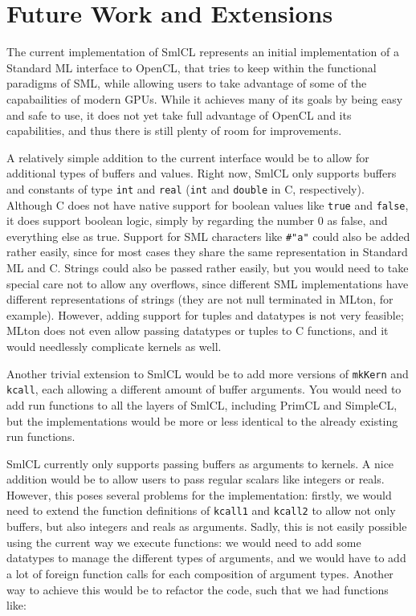 \section{Future Work and Extensions}
\label{futurework}

The current implementation of SmlCL represents an initial
implementation of a Standard ML interface to OpenCL, that tries to
keep within the functional paradigms of SML, while allowing users to
take advantage of some of the capabailities of modern GPUs. While it
achieves many of its goals by being easy and safe to use, it does not
yet take full advantage of OpenCL and its capabilities, and thus there
is still plenty of room for improvements.

A relatively simple addition to the current interface would be to
allow for additional types of buffers and values. Right now, SmlCL
only supports buffers and constants of type \texttt{int} and
\texttt{real} (\texttt{int} and \texttt{double} in C,
respectively). Although C does not have native support for boolean
values like \texttt{true} and \texttt{false}, it does support boolean
logic, simply by regarding the number $0$ as false, and everything
else as true.  Support for SML characters like \texttt{\#"a"} could
also be added rather easily, since for most cases they share the same
representation in Standard ML and C. Strings could also be passed
rather easily, but you would need to take special care not to allow
any overflows, since different SML implementations have different
representations of strings (they are not null terminated in MLton, for
example). However, adding support for tuples and datatypes is not very
feasible; MLton does not even allow passing datatypes or tuples to C
functions, and it would needlessly complicate kernels as well.

Another trivial extension to SmlCL would be to add more versions of
\texttt{mkKern} and \texttt{kcall}, each allowing a different amount
of buffer arguments. You would need to add run functions to all the
layers of SmlCL, including PrimCL and SimpleCL, but the
implementations would be more or less identical to the already
existing run functions.

SmlCL currently only supports passing buffers as arguments to
kernels. A nice addition would be to allow users to pass regular
scalars like integers or reals. However, this poses several problems
for the implementation: firstly, we would need to extend the function
definitions of \texttt{kcall1} and \texttt{kcall2} to allow not only
buffers, but also integers and reals as arguments. Sadly, this is not
easily possible using the current way we execute functions: we would
need to add some datatypes to manage the different types of arguments,
and we would have to add a lot of foreign function calls for each
composition of argument types. Another way to achieve this would be to
refactor the code, such that we had functions like:

